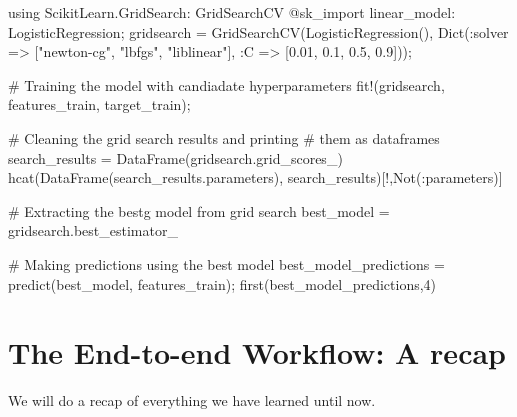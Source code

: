 \documentclass[
  letterpaper,
]{book}
\newenvironment{Shaded}{\begin{snugshade}}{\end{snugshade}}
\newcommand{\BuiltInTok}[1]{\textcolor[rgb]{0.00,0.23,0.31}{#1}}
\newcommand{\CommentTok}[1]{\textcolor[rgb]{0.37,0.37,0.37}{#1}}
\newcommand{\FloatTok}[1]{\textcolor[rgb]{0.68,0.00,0.00}{#1}}
\newcommand{\FunctionTok}[1]{\textcolor[rgb]{0.28,0.35,0.67}{#1}}
\newcommand{\ImportTok}[1]{\textcolor[rgb]{0.00,0.46,0.62}{#1}}
\newcommand{\NormalTok}[1]{\textcolor[rgb]{0.00,0.23,0.31}{#1}}
\newcommand{\OperatorTok}[1]{\textcolor[rgb]{0.37,0.37,0.37}{#1}}
\newcommand{\PreprocessorTok}[1]{\textcolor[rgb]{0.68,0.00,0.00}{#1}}
\newcommand{\StringTok}[1]{\textcolor[rgb]{0.13,0.47,0.30}{#1}}
\begin{document}
\begin{Shaded}
\begin{Highlighting}[]
\ImportTok{using} \BuiltInTok{ScikitLearn.GridSearch}\NormalTok{: GridSearchCV}
\PreprocessorTok{@sk\_import}\NormalTok{ linear\_model}\OperatorTok{:}\NormalTok{ LogisticRegression;}
\NormalTok{gridsearch }\OperatorTok{=} \FunctionTok{GridSearchCV}\NormalTok{(}\FunctionTok{LogisticRegression}\NormalTok{(),}
            \FunctionTok{Dict}\NormalTok{(}\OperatorTok{:}\NormalTok{solver }\OperatorTok{=\textgreater{}}\NormalTok{ [}\StringTok{"newton{-}cg"}\NormalTok{, }\StringTok{"lbfgs"}\NormalTok{, }\StringTok{"liblinear"}\NormalTok{], }
            \OperatorTok{:}\NormalTok{C }\OperatorTok{=\textgreater{}}\NormalTok{ [}\FloatTok{0.01}\NormalTok{, }\FloatTok{0.1}\NormalTok{, }\FloatTok{0.5}\NormalTok{, }\FloatTok{0.9}\NormalTok{]));}

\CommentTok{\# Training the model with candiadate hyperparameters}
\FunctionTok{fit!}\NormalTok{(gridsearch, features\_train, target\_train); }

\CommentTok{\# Cleaning the grid search results and printing }
\CommentTok{\# them as dataframes}
\NormalTok{search\_results }\OperatorTok{=} \FunctionTok{DataFrame}\NormalTok{(gridsearch.grid\_scores\_)}
\FunctionTok{hcat}\NormalTok{(}\FunctionTok{DataFrame}\NormalTok{(search\_results.parameters), }
\NormalTok{            search\_results)[!,}\FunctionTok{Not}\NormalTok{(}\OperatorTok{:}\NormalTok{parameters)]}

\CommentTok{\# Extracting the bestg model from grid search}
\NormalTok{best\_model }\OperatorTok{=}\NormalTok{ gridsearch.best\_estimator\_ }

\CommentTok{\# Making predictions using the best model}
\NormalTok{best\_model\_predictions }\OperatorTok{=} \FunctionTok{predict}\NormalTok{(best\_model, features\_train);}
\FunctionTok{first}\NormalTok{(best\_model\_predictions,}\FloatTok{4}\NormalTok{)}
\end{Highlighting}
\end{Shaded}

\hypertarget{the-end-to-end-workflow-a-recap}{%
\chapter{The End-to-end Workflow: A
recap}\label{the-end-to-end-workflow-a-recap}}

\begin{tcolorbox}[standard jigsaw,bottomtitle=1mm, titlerule=0mm, title={In this chapter:}, leftrule=.75mm, toptitle=1mm, arc=.35mm, rightrule=.15mm, opacitybacktitle=0.6, colframe=quarto-callout-caution-color-frame, bottomrule=.15mm, colbacktitle=quarto-callout-caution-color!10!white, colback=white, toprule=.15mm, left=2mm, coltitle=black, opacityback=0]
We will do a recap of everything we have learned until now.
\end{tcolorbox}
\end{document}
